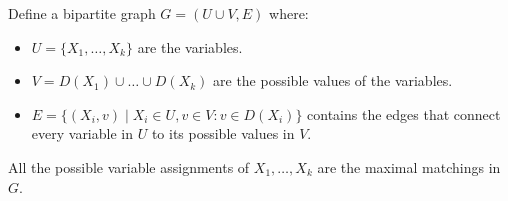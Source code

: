 \begin{descriptionlist}
\begin{example}
            Define a bipartite graph $G=(U \cup V, E)$ where:
            \begin{itemize}
                \item $U = \{ X_1, \dots, X_k \}$ are the variables.
                \item $V = D(X_1) \cup \dots \cup D(X_k)$ are the possible values of the variables.
                \item $E = \{ (X_i, v) \mid X_i \in U, v \in V: v \in D(X_i) \}$ 
                    contains the edges that connect every variable in $U$ to its possible values in $V$.
            \end{itemize} 

            All the possible variable assignments of $X_1, \dots, X_k$ are the maximal matchings in $G$.
        \end{example}
\end{descriptionlist}